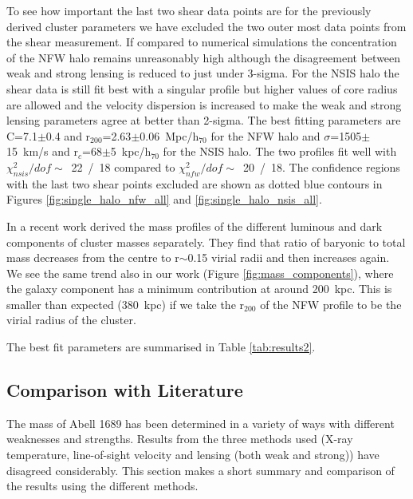 \documentclass[useAMS,usenatbib]{mn2e}
\newcounter{one}   \setcounter{one}{1}
\newcounter{two}   \setcounter{two}{2}
\newcounter{three} \setcounter{three}{3}
\begin{document}
To see how important the last two shear data points are for the
previously derived cluster parameters we have excluded the two outer
most data points from the shear measurement. If compared to numerical
simulations the concentration of the NFW halo remains unreasonably
high although the disagreement between weak and strong lensing is
reduced to just under 3-sigma. For the NSIS halo the shear data is
still fit best with a singular profile but higher values of core
radius are allowed and the velocity dispersion is increased to make
the weak and strong lensing parameters agree at better than
2-sigma. The best fitting parameters are C=7.1$\pm$0.4 and
r$_{200}$=2.63$\pm$0.06~Mpc/h$_{70}$ for the NFW halo and
$\sigma$=1505$\pm$15~km/s and r$_c$=68$\pm$5~kpc/h$_{70}$ for the NSIS
halo. The two profiles fit well with $\chi_{nsis}^2/dof\sim$~22~/~18
compared to $\chi_{nfw}^2/dof\sim$~20~/~18. The confidence regions
with the last two shear points excluded are shown as dotted blue
contours in Figures \ref{fig:single_halo_nfw_all} and
\ref{fig:single_halo_nsis_all}.

In a recent work \citet{biviano:05} derived the mass profiles of the
different luminous and dark components of cluster masses
separately. They find that ratio of baryonic to total mass decreases
from the centre to r$\sim$0.15 virial radii and then increases
again. We see the same trend also in our work (Figure
\ref{fig:mass_components}), where the galaxy component has a minimum
contribution at around 200~kpc. This is smaller than expected
(380~kpc) if we take the r$_{200}$ of the NFW profile to be the virial
radius of the cluster.

The best fit parameters are summarised in Table \ref{tab:results2}.


\subsection{Comparison with Literature}
\label{sec:literature}

The mass of Abell 1689 has been determined in a variety of ways with
different weaknesses and strengths. Results from the three methods
used (\mbox{X-ray} temperature, line-of-sight velocity and lensing
(both weak and strong)) have disagreed considerably. This section
makes a short summary and comparison of the results using the
different methods.
\end{document}

